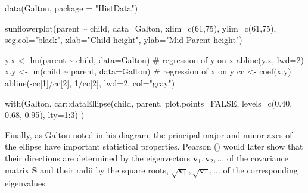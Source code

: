 \documentclass[
  letterpaper,
  10pt,
  krantz2]{krantz}
\makeatletter
\newenvironment{Shaded}{\begin{snugshade}}{\end{snugshade}}
\newcommand{\AttributeTok}[1]{\textcolor[rgb]{0.40,0.45,0.13}{#1}}
\newcommand{\CommentTok}[1]{\textcolor[rgb]{0.37,0.37,0.37}{#1}}
\newcommand{\ConstantTok}[1]{\textcolor[rgb]{0.56,0.35,0.01}{#1}}
\newcommand{\DecValTok}[1]{\textcolor[rgb]{0.68,0.00,0.00}{#1}}
\newcommand{\FloatTok}[1]{\textcolor[rgb]{0.68,0.00,0.00}{#1}}
\newcommand{\FunctionTok}[1]{\textcolor[rgb]{0.28,0.35,0.67}{#1}}
\newcommand{\NormalTok}[1]{\textcolor[rgb]{0.00,0.23,0.31}{#1}}
\newcommand{\OtherTok}[1]{\textcolor[rgb]{0.00,0.23,0.31}{#1}}
\newcommand{\SpecialCharTok}[1]{\textcolor[rgb]{0.37,0.37,0.37}{#1}}
\newcommand{\StringTok}[1]{\textcolor[rgb]{0.13,0.47,0.30}{#1}}
\newenvironment{kframe}{%
  \medskip{}
  \setlength{\fboxsep}{.8em}
  \def\at@end@of@kframe{}%
  \ifinner\ifhmode%
  \def\at@end@of@kframe{\end{minipage}}%
  \begin{minipage}{\columnwidth}%
  \fi\fi%
  \def\FrameCommand##1{\hskip\@totalleftmargin \hskip-\fboxsep
  \colorbox{shadecolor}{##1}\hskip-\fboxsep
      \hskip-\linewidth \hskip-\@totalleftmargin \hskip\columnwidth}%
  \MakeFramed {\advance\hsize-\width
    \@totalleftmargin\z@ \linewidth\hsize
    \@setminipage}}%
{\par\unskip\endMakeFramed%
  \at@end@of@kframe}
\renewenvironment{Shaded}{\begin{kframe}}{\end{kframe}}
\makeatother
\begin{document}
\begin{Shaded}
\begin{Highlighting}[]
\FunctionTok{data}\NormalTok{(Galton, }\AttributeTok{package =} \StringTok{"HistData"}\NormalTok{)}

\FunctionTok{sunflowerplot}\NormalTok{(parent }\SpecialCharTok{\textasciitilde{}}\NormalTok{ child, }\AttributeTok{data=}\NormalTok{Galton, }
      \AttributeTok{xlim=}\FunctionTok{c}\NormalTok{(}\DecValTok{61}\NormalTok{,}\DecValTok{75}\NormalTok{), }
      \AttributeTok{ylim=}\FunctionTok{c}\NormalTok{(}\DecValTok{61}\NormalTok{,}\DecValTok{75}\NormalTok{), }
      \AttributeTok{seg.col=}\StringTok{"black"}\NormalTok{, }
        \AttributeTok{xlab=}\StringTok{"Child height"}\NormalTok{, }
      \AttributeTok{ylab=}\StringTok{"Mid Parent height"}\NormalTok{)}

\NormalTok{y.x }\OtherTok{\textless{}{-}} \FunctionTok{lm}\NormalTok{(parent }\SpecialCharTok{\textasciitilde{}}\NormalTok{ child, }\AttributeTok{data=}\NormalTok{Galton)     }\CommentTok{\# regression of y on x}
\FunctionTok{abline}\NormalTok{(y.x, }\AttributeTok{lwd=}\DecValTok{2}\NormalTok{)}
\NormalTok{x.y }\OtherTok{\textless{}{-}} \FunctionTok{lm}\NormalTok{(child }\SpecialCharTok{\textasciitilde{}}\NormalTok{ parent, }\AttributeTok{data=}\NormalTok{Galton)     }\CommentTok{\# regression of x on y}
\NormalTok{cc }\OtherTok{\textless{}{-}} \FunctionTok{coef}\NormalTok{(x.y)}
\FunctionTok{abline}\NormalTok{(}\SpecialCharTok{{-}}\NormalTok{cc[}\DecValTok{1}\NormalTok{]}\SpecialCharTok{/}\NormalTok{cc[}\DecValTok{2}\NormalTok{], }\DecValTok{1}\SpecialCharTok{/}\NormalTok{cc[}\DecValTok{2}\NormalTok{], }\AttributeTok{lwd=}\DecValTok{2}\NormalTok{, }\AttributeTok{col=}\StringTok{"gray"}\NormalTok{)}

\FunctionTok{with}\NormalTok{(Galton, }
\NormalTok{     car}\SpecialCharTok{::}\FunctionTok{dataEllipse}\NormalTok{(child, parent, }
         \AttributeTok{plot.points=}\ConstantTok{FALSE}\NormalTok{, }
         \AttributeTok{levels=}\FunctionTok{c}\NormalTok{(}\FloatTok{0.40}\NormalTok{, }\FloatTok{0.68}\NormalTok{, }\FloatTok{0.95}\NormalTok{), }
         \AttributeTok{lty=}\DecValTok{1}\SpecialCharTok{:}\DecValTok{3}\NormalTok{)}
\NormalTok{    )}
\end{Highlighting}
\end{Shaded}

Finally, as Galton noted in his diagram, the principal major and minor
axes of the ellipse have important statistical properties. Pearson
() would later show that their
directions are determined by the eigenvectors
\(\mathbf{v}_1, \mathbf{v}_2, \dots\) of the covariance matrix
\(\mathbf{S}\) and their radii by the square roots,
\(\sqrt{\mathbf{v}_1}, \sqrt{\mathbf{v}_1}, \dots\) of the corresponding
eigenvalues.
\end{document}

